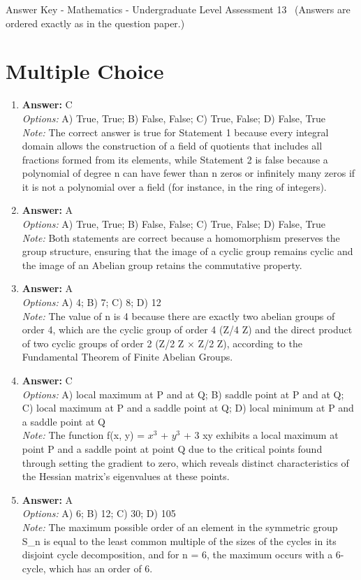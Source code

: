 \documentclass[12pt]{article}
\begin{document}
\begin{center}
Answer Key - Mathematics - Undergraduate Level Assessment 13 \
\small (Answers are ordered exactly as in the question paper.)
\end{center}

\section*{Multiple Choice}
\begin{enumerate}[label=\arabic*.]
\item \textbf{Answer:} C
\\ \textit{Options:} A) True, True; B) False, False; C) True, False; D) False, True
\\ \textit{Note:} The correct answer is true for Statement 1 because every integral domain allows the construction of a field of quotients that includes all fractions formed from its elements, while Statement 2 is false because a polynomial of degree n can have fewer than n zeros or infinitely many zeros if it is not a polynomial over a field (for instance, in the ring of integers).
\item \textbf{Answer:} A
\\ \textit{Options:} A) True, True; B) False, False; C) True, False; D) False, True
\\ \textit{Note:} Both statements are correct because a homomorphism preserves the group structure, ensuring that the image of a cyclic group remains cyclic and the image of an Abelian group retains the commutative property.
\item \textbf{Answer:} A
\\ \textit{Options:} A) 4; B) 7; C) 8; D) 12
\\ \textit{Note:} The value of n is 4 because there are exactly two abelian groups of order 4, which are the cyclic group of order 4 (Z/4 Z) and the direct product of two cyclic groups of order 2 (Z/2 Z × Z/2 Z), according to the Fundamental Theorem of Finite Abelian Groups.
\item \textbf{Answer:} C
\\ \textit{Options:} A) local maximum at P and at Q; B) saddle point at P and at Q; C) local maximum at P and a saddle point at Q; D) local minimum at P and a saddle point at Q
\\ \textit{Note:} The function f(x, y) = $x^3$ + $y^3$ + 3 xy exhibits a local maximum at point P and a saddle point at point Q due to the critical points found through setting the gradient to zero, which reveals distinct characteristics of the Hessian matrix's eigenvalues at these points.
\item \textbf{Answer:} A
\\ \textit{Options:} A) 6; B) 12; C) 30; D) 105
\\ \textit{Note:} The maximum possible order of an element in the symmetric group S\_n is equal to the least common multiple of the sizes of the cycles in its disjoint cycle decomposition, and for n = 6, the maximum occurs with a 6-cycle, which has an order of 6.
\end{enumerate}
\end{document}
